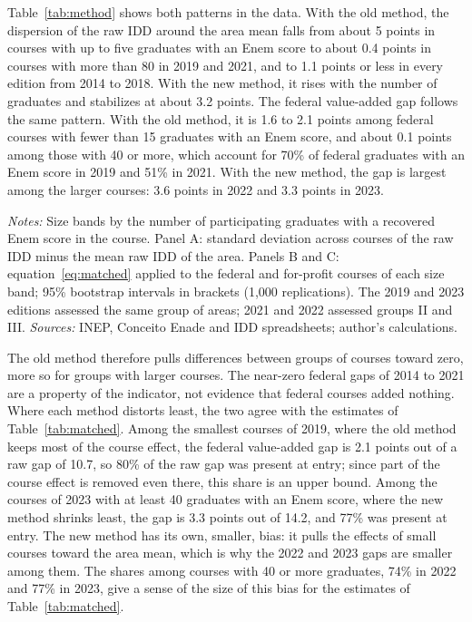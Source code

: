 \documentclass[11pt,a4paper]{article}
\begin{document}
Table~\ref{tab:method} shows both patterns in the data. With the old method, the dispersion of the raw IDD around the area mean falls from about 5 points in courses with up to five graduates with an Enem score to about 0.4 points in courses with more than 80 in 2019 and 2021, and to 1.1 points or less in every edition from 2014 to 2018. With the new method, it rises with the number of graduates and stabilizes at about 3.2 points. The federal value-added gap follows the same pattern. With the old method, it is 1.6 to 2.1 points among federal courses with fewer than 15 graduates with an Enem score, and about 0.1 points among those with 40 or more, which account for 70\% of federal graduates with an Enem score in 2019 and 51\% in 2021. With the new method, the gap is largest among the larger courses: 3.6 points in 2022 and 3.3 points in 2023.

\begin{table}[H]
\centering\small
\caption{The IDD method and course size: dispersion of the IDD and federal gaps}\label{tab:method}

\begin{minipage}{\linewidth}\vspace{0.4em}\scriptsize
\textit{Notes:} Size bands by the number of participating graduates with a recovered Enem score in the course. Panel A: standard deviation across courses of the raw IDD minus the mean raw IDD of the area. Panels B and C: equation~\eqref{eq:matched} applied to the federal and for-profit courses of each size band; 95\% bootstrap intervals in brackets (1,000 replications). The 2019 and 2023 editions assessed the same group of areas; 2021 and 2022 assessed groups II and III. \textit{Sources:} INEP, Conceito Enade and IDD spreadsheets; author's calculations.
\end{minipage}
\end{table}

The old method therefore pulls differences between groups of courses toward zero, more so for groups with larger courses. The near-zero federal gaps of 2014 to 2021 are a property of the indicator, not evidence that federal courses added nothing. Where each method distorts least, the two agree with the estimates of Table~\ref{tab:matched}. Among the smallest courses of 2019, where the old method keeps most of the course effect, the federal value-added gap is 2.1 points out of a raw gap of 10.7, so 80\% of the raw gap was present at entry; since part of the course effect is removed even there, this share is an upper bound. Among the courses of 2023 with at least 40 graduates with an Enem score, where the new method shrinks least, the gap is 3.3 points out of 14.2, and 77\% was present at entry. The new method has its own, smaller, bias: it pulls the effects of small courses toward the area mean, which is why the 2022 and 2023 gaps are smaller among them. The shares among courses with 40 or more graduates, 74\% in 2022 and 77\% in 2023, give a sense of the size of this bias for the estimates of Table~\ref{tab:matched}.
\end{document}
